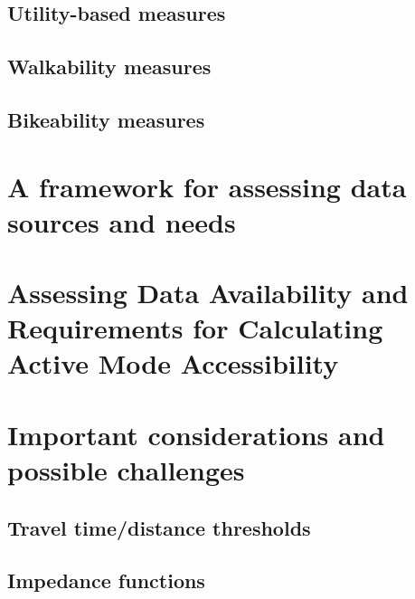 \documentclass[
11pt, %
oneside, %
english, %
singlespacing, %
]{macthesis} %
\begin{document}
\hypertarget{utility-based-measures}{%
\subsection{Utility-based measures}\label{utility-based-measures}}

\hypertarget{walkability-measures}{%
\subsection{Walkability measures}\label{walkability-measures}}

\hypertarget{bikeability-measures}{%
\subsection{Bikeability measures}\label{bikeability-measures}}

\hypertarget{a-framework-for-assessing-data-sources-and-needs}{%
\section{A framework for assessing data sources and needs}\label{a-framework-for-assessing-data-sources-and-needs}}

\hypertarget{assessing-data-availability-and-requirements-for-calculating-active-mode-accessibility}{%
\section{Assessing Data Availability and Requirements for Calculating Active Mode Accessibility}\label{assessing-data-availability-and-requirements-for-calculating-active-mode-accessibility}}

\hypertarget{important-considerations-and-possible-challenges}{%
\section{Important considerations and possible challenges}\label{important-considerations-and-possible-challenges}}

\hypertarget{travel-timedistance-thresholds}{%
\subsection{Travel time/distance thresholds}\label{travel-timedistance-thresholds}}

\hypertarget{impedance-functions}{%
\subsection{Impedance functions}\label{impedance-functions}}
\end{document}
